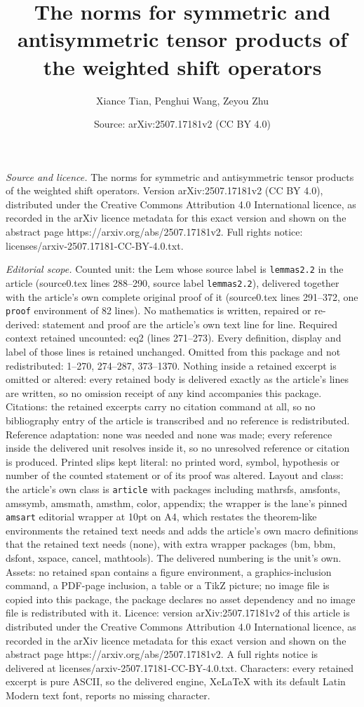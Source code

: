\documentclass[10pt,a4paper]{amsart}
\title[The norms for symmetric and antisymmetric tensor products of]{The norms for symmetric and antisymmetric tensor products of the weighted shift operators}
\author{Xiance Tian, Penghui Wang, Zeyou Zhu}
\date{Source: arXiv:2507.17181v2 (CC BY 4.0)}
\begin{document}
\maketitle

\noindent\emph{Source and licence.} The norms for symmetric and antisymmetric tensor products of the weighted shift operators. Version arXiv:2507.17181v2 (CC BY 4.0), distributed under the Creative Commons Attribution 4.0 International licence, as recorded in the arXiv licence metadata for this exact version and shown on the abstract page https://arxiv.org/abs/2507.17181v2. Full rights notice: licenses/arxiv-2507.17181-CC-BY-4.0.txt.\par\smallskip

\noindent\textit{Editorial scope.} Counted unit: the Lem whose source label is \texttt{lemmas2.2} in the article (source0.tex lines 288--290, source label \texttt{lemmas2.2}), delivered together with the article's own complete original proof of it (source0.tex lines 291--372, one \texttt{proof} environment of 82 lines). No mathematics is written, repaired or re-derived: statement and proof are the article's own text line for line. Required context retained uncounted: eq2 (lines 271--273). Every definition, display and label of those lines is retained unchanged. Omitted from this package and not redistributed: 1--270, 274--287, 373--1370. Nothing inside a retained excerpt is omitted or altered: every retained body is delivered exactly as the article's lines are written, so no omission receipt of any kind accompanies this package. Citations: the retained excerpts carry no citation command at all, so no bibliography entry of the article is transcribed and no reference is redistributed. Reference adaptation: none was needed and none was made; every reference inside the delivered unit resolves inside it, so no unresolved reference or citation is produced. Printed slips kept literal: no printed word, symbol, hypothesis or number of the counted statement or of its proof was altered. Layout and class: the article's own class is \texttt{article} with packages including mathrsfs, amsfonts, amssymb, amsmath, amsthm, color, appendix; the wrapper is the lane's pinned \texttt{amsart} editorial wrapper at 10pt on A4, which restates the theorem-like environments the retained text needs and adds the article's own macro definitions that the retained text needs (none), with extra wrapper packages (bm, bbm, dsfont, xspace, cancel, mathtools). The delivered numbering is the unit's own. Assets: no retained span contains a figure environment, a graphics-inclusion command, a PDF-page inclusion, a table or a TikZ picture; no image file is copied into this package, the package declares no asset dependency and no image file is redistributed with it. Licence: version arXiv:2507.17181v2 of this article is distributed under the Creative Commons Attribution 4.0 International licence, as recorded in the arXiv licence metadata for this exact version and shown on the abstract page https://arxiv.org/abs/2507.17181v2. A full rights notice is delivered at licenses/arxiv-2507.17181-CC-BY-4.0.txt. Characters: every retained excerpt is pure ASCII, so the delivered engine, XeLaTeX with its default Latin Modern text font, reports no missing character.
\end{document}
